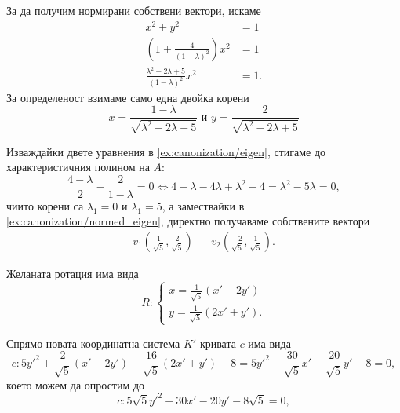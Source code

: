 \documentclass[
  headings=standardclasses,
  bibliography=totocnumbered,
]{scrartcl}
\begin{document}
\begin{solution}
\begin{enumerate}
    За да получим нормирани собствени вектори, искаме
    \begin{align*}
      x^2 + y^2 &= 1 \\
      \left(1 +  \frac 4 {{(1 - \lambda)}^2} \right) x^2 &= 1 \\
      \frac {\lambda^2 - 2\lambda + 5} {{(1 - \lambda)}^2} x^2 &= 1.
    \end{align*}
    За определеност взимаме само една двойка корени
    \begin{equation}
      \label{ex:canonization/normed_eigen}
      x = \frac {1 - \lambda} {\sqrt{\lambda^2 - 2\lambda + 5}}
      \text{ и }
      y = \frac 2 {\sqrt{\lambda^2 - 2\lambda + 5}}
    \end{equation}

    Изваждайки двете уравнения в \eqref{ex:canonization/eigen}, стигаме до характеристичния полином на \( A \):
    \begin{equation*}
      \frac {4 - \lambda} 2 - \frac 2 {1 - \lambda} = 0 \iff 4 - \lambda - 4\lambda + \lambda^2 - 4 = \lambda^2 - 5\lambda = 0,
    \end{equation*}
    чиито корени са \( \lambda_1 = 0 \) и \( \lambda_1 = 5 \), а замествайки в \eqref{ex:canonization/normed_eigen}, директно получаваме собствените вектори
    \begin{align*}
      v_1 \left(\frac 1 {\sqrt 5}, \frac 2 {\sqrt 5} \right)
      &&
      v_2 \left(\frac {-2} {\sqrt 5}, \frac 1 {\sqrt 5} \right).
    \end{align*}

    Желаната ротация има вида
    \begin{equation*}
      R: \begin{cases}
        x = \frac 1 {\sqrt 5} (x' - 2y') \\
        y = \frac 1 {\sqrt 5} (2x' + y').
      \end{cases}
    \end{equation*}

    Спрямо новата координатна система \( K' \) кривата \( c \) има вида
    \begin{equation*}
      c: 5y'^2 + \frac 2 {\sqrt 5} (x' - 2y') - \frac {16} {\sqrt 5} (2x' + y') - 8 = 5y'^2 - \frac {30} {\sqrt 5} x' - \frac {20} {\sqrt 5} y' - 8 = 0,
    \end{equation*}
    което можем да опростим до
    \begin{equation*}
      c: 5 \sqrt 5 y'^2 - 30 x' - 20 y' - 8 \sqrt 5 = 0,
    \end{equation*}


\end{enumerate}
\end{solution}
\end{document}

